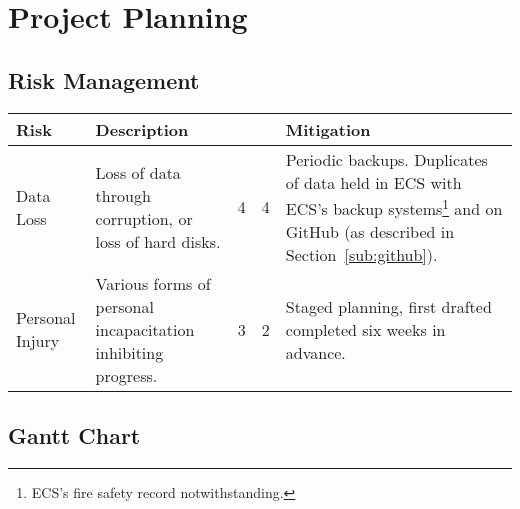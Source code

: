 \chapter{Project Planning}

\begin{landscape}
\section{Risk Management}
\begin{tabu} to 0.9\linewidth { X[3,r] | X[7,l] | X[c] | X[c] | X[7,l] }
Risk & Description &  &  & Mitigation \\ \hline
Data Loss &
  Loss of data through corruption, or loss of hard disks. &
  4 & 4 &
  Periodic backups. Duplicates of data held in ECS with ECS's backup systems\footnote{ECS's fire safety record notwithstanding.} and on GitHub (as described in Section~\ref{sub:github}). \\
Personal Injury &
  Various forms of personal incapacitation inhibiting progress. &
  3 & 2 &
  Staged planning, first drafted completed six weeks in advance. \\
\end{tabu}

\newpage
\section{Gantt Chart}

\end{landscape}


